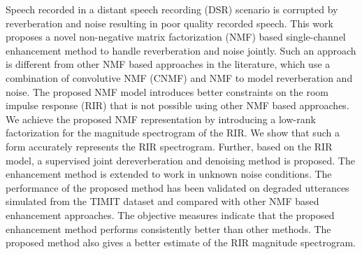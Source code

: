 \begin{Abstract}
Speech recorded in a distant speech recording (DSR) scenario is corrupted by reverberation and noise resulting in poor quality recorded speech. This work proposes a novel non-negative matrix factorization (NMF) based single-channel enhancement method to handle reverberation and noise jointly. Such an approach is different from other NMF based approaches in the literature, which use a combination of convolutive NMF (CNMF) and NMF to model reverberation and noise. The proposed NMF model introduces better constraints on the room impulse response (RIR) that is not possible using other NMF based approaches.
We achieve the proposed NMF representation by introducing a low-rank factorization for the magnitude spectrogram of the RIR. We show that such a form accurately represents the RIR spectrogram.
Further, based on the RIR model, a supervised joint dereverberation and denoising method is proposed. The enhancement method is extended to work in unknown noise conditions. The performance of the proposed method has been validated on degraded utterances simulated from the TIMIT dataset and compared with other NMF based enhancement approaches. The objective measures indicate that the proposed enhancement method performs consistently better than other methods. The proposed method also gives a better estimate of the RIR magnitude spectrogram.
%
%
%
%
%
\end{Abstract}

